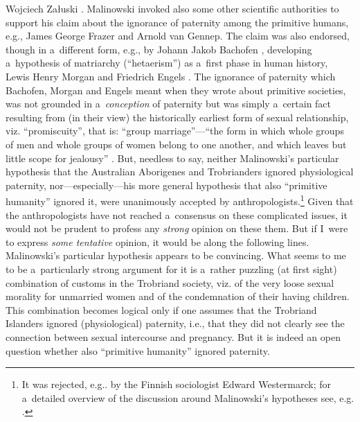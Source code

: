 \begin{artengenv}{Wojciech Załuski}
\parencite[][p.181,200]{malinowski_family_1913}. %
 Malinowski invoked also some other scientific authorities to support his claim about the ignorance of paternity among the primitive humans, e.g., James George Frazer and Arnold van Gennep. The claim was also endorsed, though in a~different form, e.g., by Johann Jakob Bachofen 
\parencite*[][]{bachofen_myth_1967}, %
 developing a~hypothesis of matriarchy (``hetaerism'') as a~first phase in human history, Lewis Henry Morgan 
\parencite*[][]{morgan_systems_1870} %
 and Friedrich Engels 
\parencite*[][]{engels_origin_2004}. %
 The ignorance of paternity which Bachofen, Morgan and Engels meant when they wrote about primitive societies, was not grounded in a~\textit{conception} of paternity but was simply a~certain fact resulting from (in their view) the historically earliest form of sexual relationship, viz. ``promiscuity'', that is: ``group marriage''---``the form in which whole groups of men and whole groups of women belong to one another, and which leaves but little scope for jealousy'' 
\parencite[][p.50]{engels_origin_2004}. %
 But, needless to say, neither Malinowski's particular hypothesis that the Australian Aborigenes and Trobrianders ignored physiological paternity, nor---especially---his more general hypothesis that also ``primitive humanity'' ignored it, were unanimously accepted by anthropologists.\footnote{It was rejected, e.g.. by the Finnish sociologist Edward Westermarck; for a~detailed overview of the discussion around Malinowski's hypotheses see, e.g. 
\parencite[][]{pulman_malinowski_2004}.%
} Given that the anthropologists have not reached a~consensus on these complicated issues, it would not be prudent to profess any \textit{strong} opinion on these them. But if I~were to express \textit{some tentative} opinion, it would be along the following lines. Malinowski's particular hypothesis appears to be convincing. What seems to me to be a~particularly strong argument for it is a~rather puzzling (at first sight) combination of customs in the Trobriand society, viz. of the very loose sexual morality for unmarried women and of the condemnation of their having children. This combination becomes logical only if one assumes that the Trobriand Islanders ignored (physiological) paternity, i.e., that they did not clearly see the connection between sexual intercourse and pregnancy. But it is indeed an open question whether also ``primitive humanity'' ignored paternity.


\end{artengenv}
